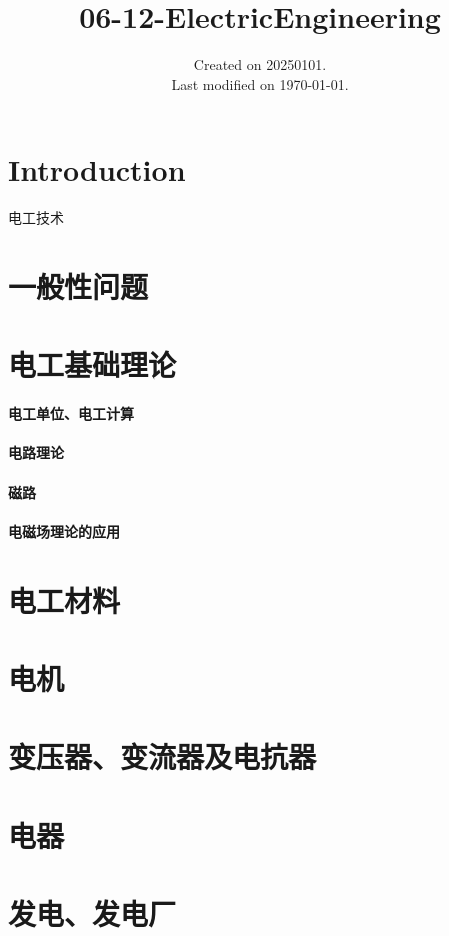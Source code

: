 \documentclass[UTF8]{../../ApplicationUniverse}
\begin{document}
\title{06-12-ElectricEngineering}
\date{Created on 20250101.\\   Last modified on \today.}
\maketitle
\tableofcontents


\chapter{Introduction}

电工技术


\chapter{一般性问题}
\chapter{电工基础理论}
    \subsubsection{电工单位、电工计算}
    \subsubsection{电路理论}
    \subsubsection{磁路}
    \subsubsection{电磁场理论的应用}


\chapter{电工材料}
\chapter{电机}
\chapter{变压器、变流器及电抗器}
\chapter{电器}
\chapter{发电、发电厂}
\end{document}
